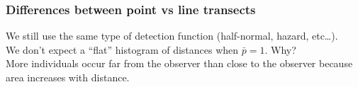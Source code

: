 \documentclass[color=usenames,dvipsnames,handout]{beamer}\usepackage[]{graphicx}\usepackage[]{xcolor}
\begin{document}
\begin{frame}
  \frametitle{Differences between point vs line transects}
  \large
  {We still use the same type of detection function (half-normal,
    hazard, etc\dots). \\}
  \pause
  \vfill %
  {We don't expect a ``flat'' histogram of distances when
    $\bar{p}=1$. Why? \\}
  \pause
  \vfill %
  {More individuals occur far from the observer than close to the
    observer because area increases with distance. } \\
\end{frame}





\end{document}
